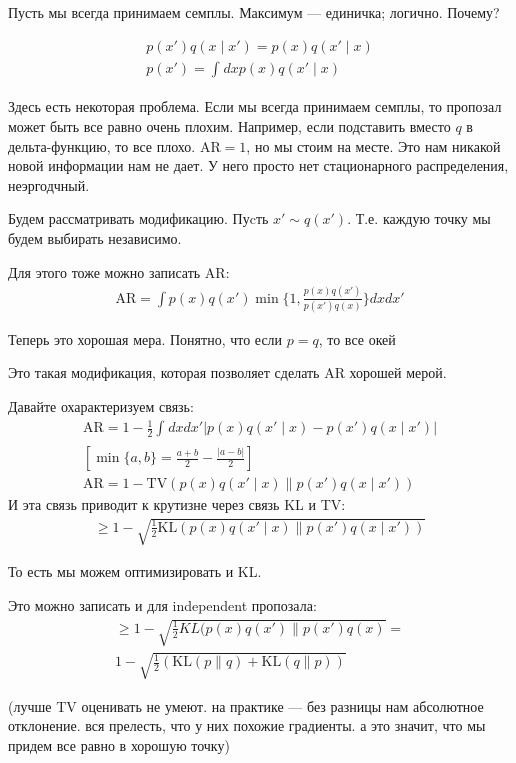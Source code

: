 \documentclass{minimal}
\begin{document}
Пусть мы всегда принимаем семплы.
Максимум --- единичка; логично. Почему?

\begin{gather*}
    p(x')q(x\mid x')=p(x)q(x' \mid x)\\
    p(x')=\int_{}^{} {dx p(x)q(x' \mid x)}
\end{gather*}

Здесь есть некоторая проблема. Если мы всегда принимаем семплы, то пропозал может быть все равно очень плохим. Например, если подставить вместо $q$ в дельта-функцию, то все плохо. $\mathrm{AR}=1$, но мы стоим на месте. Это нам никакой новой информации нам не дает. У него просто нет стационарного распределения, неэргодчный.

Будем рассматривать модификацию.
Пуcть $x' \sim q(x')$. Т.е. каждую точку мы будем выбирать независимо.

Для этого тоже можно записать AR:
 \begin{gather*}
     \mathrm{AR}=\int p(x)q(x')\min\{1, \frac{p(x)q(x')}{p(x')q(x)}\}dxdx'
\end{gather*}

Теперь это хорошая мера. Понятно, что если $p=q$, то все окей

Это такая модификация, которая позволяет сделать AR хорошей мерой.

Давайте охарактеризуем связь:
\begin{gather*}
    \mathrm{AR}=1-\frac{1}{2}\int_{}^{} {dxdx'|p(x)q(x'\mid x)-p(x')q(x \mid x')|}\\
    [\min\{a, b\}=\frac{a+b}{2}-\frac{|a-b|}{2}]\\
    \mathrm{AR}=1-\mathrm{TV}(p(x)q(x'\mid x)\|p(x')q(x\mid x'))
\end{gather*}
И эта связь приводит к крутизне через связь KL и TV:
\begin{gather*}
    \geq 1-\sqrt{\frac{1}{2}\mathrm{KL}(p(x)q(x'\mid x)\|p(x')q(x\mid x'))}
\end{gather*}

То есть мы можем оптимизировать и KL.

Это можно записать и для independent пропозала:
\begin{gather*}
    \geq 1-\sqrt{\frac{1}{2}KL(p(x)q(x')\|p(x')q(x)}=\\
    1-\sqrt{\frac{1}{2}(\mathrm{KL}(p\|q)+\mathrm{KL}(q\|p))}
\end{gather*}

(лучше TV оценивать не умеют. на практике --- без разницы нам абсолютное отклонение. вся прелесть, что у них похожие градиенты. а это значит, что мы придем все равно в хорошую точку)
\end{document}
